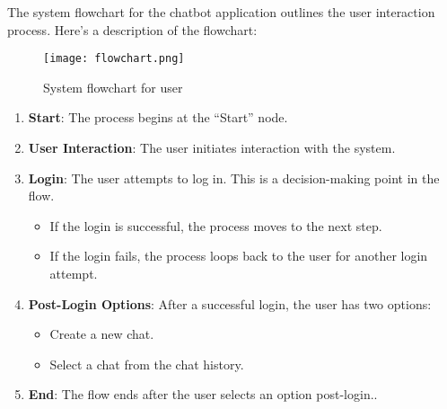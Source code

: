 The system flowchart for the chatbot application outlines the user interaction process. Here's a description of the flowchart:

\begin{figure}[h!]
  \centering
  \texttt{[image: flowchart.png]}
  \caption{System flowchart for user}\label{fig:flowchart}
\end{figure}

\begin{enumerate}
  \item \textbf{Start}: The process begins at the “Start” node.
  \item \textbf{User Interaction}: The user initiates interaction with the system.
  \item \textbf{Login}: The user attempts to log in. This is a decision-making point in the flow.
  \begin{itemize}
    \item If the login is successful, the process moves to the next step.
    \item If the login fails, the process loops back to the user for another login attempt.
  \end{itemize}
  \item \textbf{Post-Login Options}: After a successful login, the user has two options:
  \begin{itemize}
    \item Create a new chat.
    \item Select a chat from the chat history.
  \end{itemize}
  \item \textbf{End}: The flow ends after the user selects an option post-login..
\end{enumerate}
